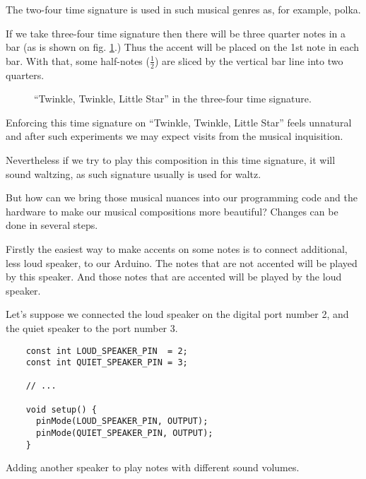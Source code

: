 \documentclass[../sparc.tex]{subfiles}
\begin{document}
The two-four time signature is used in such musical genres as, for example,
polka.

If we take three-four time signature then there will be three quarter notes in a
bar (as is shown on fig. \ref{fig:lilypond-musical-scale-example-4}.)  Thus the
accent will be placed on the 1st note in each bar.  With that, some half-notes
($\frac{1}{2}$) are sliced by the vertical bar line into two quarters.

\begin{figure}[h]
  \centering
  \caption{``Twinkle, Twinkle, Little Star'' in the three-four time signature.}
  \label{fig:lilypond-musical-scale-example-4}
\end{figure}

Enforcing this time signature on ``Twinkle, Twinkle, Little Star'' feels
unnatural and after such experiments we may expect visits from the musical
inquisition.

Nevertheless if we try to play this composition in this time signature, it will
sound waltzing, as such signature usually is used for waltz.

But how can we bring those musical nuances into our programming code and the
hardware to make our musical compositions more beautiful?  Changes can be done
in several steps.

Firstly the easiest way to make accents on some notes is to connect additional,
less loud speaker, to our Arduino.  The notes that are not accented will be
played by this speaker.  And those notes that are accented will be played by the
loud speaker.

Let's suppose we connected the loud speaker on the digital port number 2, and
the quiet speaker to the port number 3.

\begin{listing}[ht]
  \begin{verbatim}
    const int LOUD_SPEAKER_PIN  = 2;
    const int QUIET_SPEAKER_PIN = 3;

    // ...

    void setup() {
      pinMode(LOUD_SPEAKER_PIN, OUTPUT);
      pinMode(QUIET_SPEAKER_PIN, OUTPUT);
    }
  \end{verbatim}
  \label{listing:adding-additional-speaker}
  \caption{Adding another speaker to play notes with different sound volumes.}
\end{listing}
\end{document}
